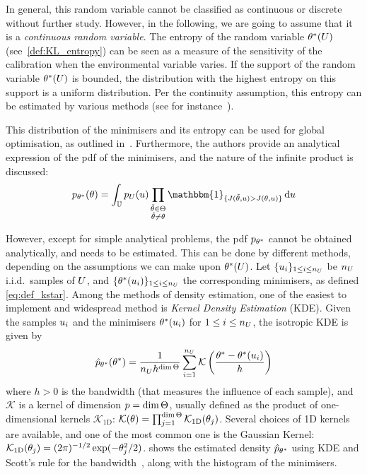 \documentclass[../../Main_ManuscritThese.tex]{subfiles}
\begin{document}
In general, this random variable cannot be classified as continuous or
discrete without further study. However, in the following, we are
going to assume that it is a \emph{continuous random variable}.  The
entropy of the random variable $\theta^*(U)$
(see~\cref{def:KL_entropy}) can be seen as a measure of the
sensitivity of the calibration when the environmental variable
varies. If the support of the random variable $\theta^*(U)$ is bounded,
the distribution with the highest entropy on this support is a uniform
distribution.  Per the continuity assumption, this entropy can be
estimated by various methods (see for
instance~\cite{beirlant_nonparametric_1997}).


This distribution of the minimisers and its entropy can be used for
global optimisation, as outlined
in~\cite{hennig_entropy_2011}. Furthermore, the authors provide an
analytical expression of the pdf of the minimisers, and the nature of
the infinite product is discussed:
\begin{equation}
  p_{\KK^*}(\kk) = \int_{\Uspace} p_{\UU}(\uu)\prod_{\substack{\tilde{\kk}\in \Kspace\\\tilde{\kk}\neq \kk}} \mathbbm{1}_{\{J(\tilde{\kk},\uu) > J(\kk, \uu)\}}\,\mathrm{d}\uu
\end{equation}

However, except for simple analytical problems, the pdf $p_{\theta^*}$
cannot be obtained analytically, and needs to be estimated. This can
be done by different methods, depending on the assumptions we can make
upon $\theta^*(U)$. Let $\{u_i\}_{1\leq i \leq n_{U}}$ be $n_{U}$
i.i.d.\ samples of $U$, and
$\{\theta^*(u_i)\}_{1\leq i \leq n_{U}}$ the corresponding
minimisers, as defined \cref{eq:def_kstar}. Among the methods of
density estimation, one of the easiest to implement and widespread
method is \emph{Kernel Density Estimation} (KDE).  Given the samples
$u_i$ and the minimisers $\theta^*(u_i)$ for $1\leq i \leq n_{U}$,
the isotropic KDE is given by
\begin{equation}
  \hat{p}_{\theta^*}(\theta^*) = \frac{1}{n_{U} h^{\dim \Theta}} \sum_{i=1}^{n_{U}} \mathcal{K}\left(\frac{\theta^* - \theta^*(u_i)}{h}\right)
\end{equation}
where $h>0$ is the bandwidth (that measures the influence of each
sample), and $\mathcal{K}$ is a kernel of dimension $p=\dim \Theta$,
usually defined as the product of one-dimensional kernels
$\mathcal{K}_{1\mathrm{D}}$:
$\mathcal{K}(\theta) = \prod_{j=1}^{\dim
  \Theta}\mathcal{K}_{1\mathrm{D}}(\theta_j)$. Several choices of 1D
kernels are available, and one of the most common one is the Gaussian
Kernel:
$\mathcal{K}_{1\mathrm{D}}(\theta_j) = (2\pi)^{-1/2}\exp(-\theta_j^2
/2)$.  shows the estimated density
$\hat{p}_{\theta^*}$ using KDE and Scott's rule for the
bandwidth~\citep{scott_optimal_1979}, along with the histogram of the
minimisers.
\end{document}
